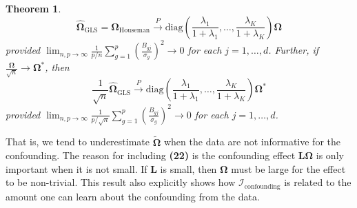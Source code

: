 \documentclass{article}
\newtheorem{theorem}{Theorem}[section]
\begin{document}
\begin{theorem}
\begin{equation}
\hat{\bm{\Omega}}_{\text{GLS}} = \hat{\bm{\Omega}}_{\text{Houseman}} \stackrel{P}{\to} \text{diag}\left( \frac{\lambda_1}{1+\lambda_1}, \ldots, \frac{\lambda_K}{1+\lambda_K} \right) \bm{\Omega}
\end{equation}
provided $\lim_{n, p \to \infty} \frac{1}{p/n} \sum\limits_{g=1}^p \left( \frac{B_{gj}}{\sigma_g} \right)^2 \to 0$ for each $j = 1, \ldots, d$. Further, if $\frac{\bm{\Omega}}{\sqrt{n}} \to \bm{\Omega}^*$, then
\begin{equation}
\frac{1}{\sqrt{n}}\hat{\bm{\Omega}}_{\text{GLS}} \stackrel{P}{\to} \text{diag}\left( \frac{\lambda_1}{1+\lambda_1}, \ldots, \frac{\lambda_K}{1+\lambda_K} \right) \bm{\Omega}^*
\end{equation}
provided $\lim_{n, p \to \infty} \frac{1}{p/\sqrt{n}} \sum\limits_{g=1}^p \left( \frac{B_{gj}}{\sigma_g} \right)^2 \to 0$ for each $j = 1, \ldots, d$.
\end{theorem}
That is, we tend to underestimate $\tilde{\bm{\Omega}}$ when the data are not informative for the confounding. The reason for including \textbf{(22)} is the confounding effect $\bm{L}\bm{\Omega}$ is only important when it is not small. If $\bm{L}$ is small, then $\bm{\Omega}$ must be large for the effect to be non-trivial. This result also explicitly shows how $\mathcal{I}_{\text{confounding}}$ is related to the amount one can learn about the confounding from the data.
\end{document}
